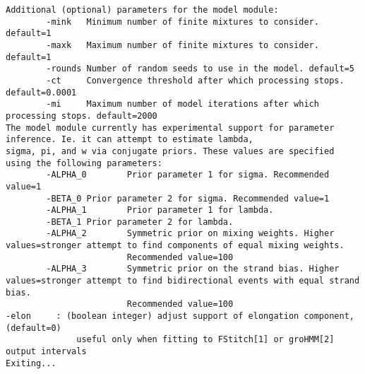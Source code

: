 \begin{lstlisting}
Additional (optional) parameters for the model module:
        -mink   Minimum number of finite mixtures to consider. default=1
        -maxk   Maximum number of finite mixtures to consider. default=1
        -rounds Number of random seeds to use in the model. default=5
        -ct     Convergence threshold after which processing stops. default=0.0001
        -mi     Maximum number of model iterations after which processing stops. default=2000
The model module currently has experimental support for parameter inference. Ie. it can attempt to estimate lambda,
sigma, pi, and w via conjugate priors. These values are specified using the following parameters:
        -ALPHA_0        Prior parameter 1 for sigma. Recommended value=1
        -BETA_0 Prior parameter 2 for sigma. Recommended value=1
        -ALPHA_1        Prior parameter 1 for lambda.
        -BETA_1 Prior parameter 2 for lambda.
        -ALPHA_2        Symmetric prior on mixing weights. Higher values=stronger attempt to find components of equal mixing weights.
                        Recommended value=100
        -ALPHA_3        Symmetric prior on the strand bias. Higher values=stronger attempt to find bidirectional events with equal strand bias.
                        Recommended value=100
-elon     : (boolean integer) adjust support of elongation component, (default=0)
              useful only when fitting to FStitch[1] or groHMM[2] output intervals
Exiting...
\end{lstlisting}

